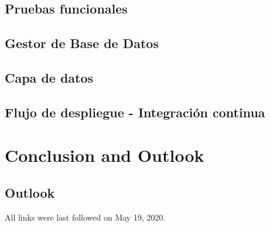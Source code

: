 \documentclass[
  a4paper,  %
  twoside,  %
  bibliography=totoc,
  headsepline,
  cleardoublepage=empty,
  parskip=half,
  draft=false
]{scrbook}
\begin{document}
\section{Pruebas funcionales}



\section{Gestor de Base de Datos}



\section{Capa de datos}



\section{Flujo de despliegue - Integración continua}



\blinddocument

\chapter{Conclusion and Outlook}
\label{chap:zusfas}

\section*{Outlook}

\printbibliography

All links were last followed on May 19, 2020.

\appendix


\pagestyle{empty}
\renewcommand*{\chapterpagestyle}{empty}
\Versicherung
\end{document}
